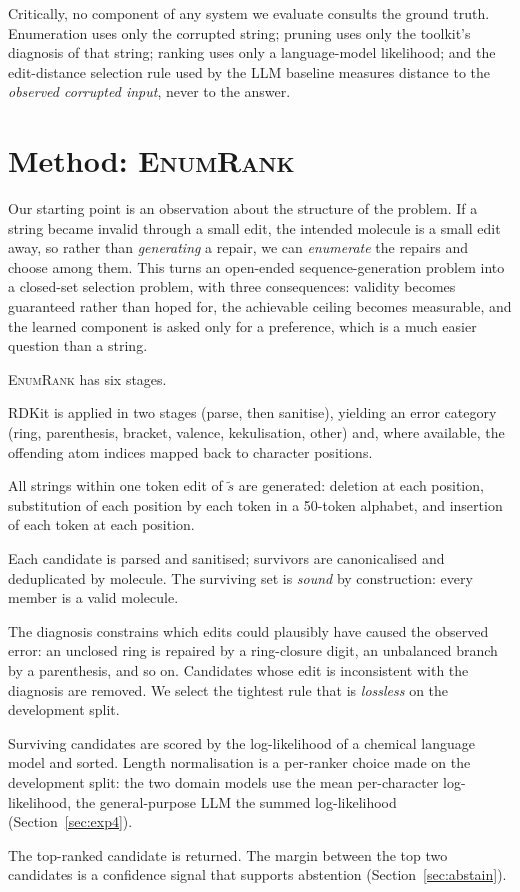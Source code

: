 \documentclass[journal=jcisd8,manuscript=article]{achemso}
\newcommand{\ours}{\textsc{EnumRank}}
\begin{document}
Critically, no component of any system we evaluate consults the ground truth.
Enumeration uses only the corrupted string; pruning uses only the toolkit's
diagnosis of that string; ranking uses only a language-model likelihood; and the
edit-distance selection rule used by the LLM baseline measures distance to the
\emph{observed corrupted input}, never to the answer.

\section{Method: \ours{}}\label{sec:method}

Our starting point is an observation about the structure of the problem. If a
string became invalid through a small edit, the intended molecule is a small
edit away, so rather than \emph{generating} a repair, we can \emph{enumerate}
the repairs and choose among them. This turns an open-ended sequence-generation
problem into a closed-set selection problem, with three consequences: validity
becomes guaranteed rather than hoped for, the achievable ceiling becomes
measurable, and the learned component is asked only for a preference, which is a
much easier question than a string.

\ours{} has six stages.

\begin{description}\itemsep3pt
\item[1. Diagnose.] RDKit is applied in two stages (parse, then sanitise),
  yielding an error category (ring, parenthesis, bracket, valence,
  kekulisation, other) and, where available, the offending atom indices mapped
  back to character positions.
\item[2. Enumerate.] All strings within one token edit of $\tilde{s}$ are
  generated: deletion at each position, substitution of each position by each
  token in a 50-token alphabet, and insertion of each token at each position.
\item[3. Verify.] Each candidate is parsed and sanitised; survivors are
  canonicalised and deduplicated by molecule. The surviving set is \emph{sound}
  by construction: every member is a valid molecule.
\item[4. Prune.] The diagnosis constrains which edits could plausibly have
  caused the observed error: an unclosed ring is repaired by a ring-closure
  digit, an unbalanced branch by a parenthesis, and so on. Candidates whose edit
  is inconsistent with the diagnosis are removed. We select the tightest rule
  that is \emph{lossless} on the development split.
\item[5. Rank.] Surviving candidates are scored by the log-likelihood of a
  chemical language model and sorted. Length normalisation is a per-ranker
  choice made on the development split: the two domain models use the mean
  per-character log-likelihood, the general-purpose LLM the summed
  log-likelihood (Section~\ref{sec:exp4}).
\item[6. Recover or abstain.] The top-ranked candidate is returned. The margin
  between the top two candidates is a confidence signal that supports
  abstention (Section~\ref{sec:abstain}).
\end{description}
\end{document}
